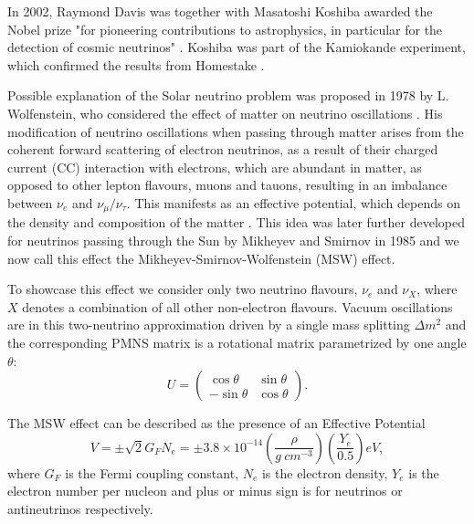 In 2002, Raymond Davis was together with Masatoshi Koshiba awarded the Nobel prize "for pioneering contributions to astrophysics, in particular for the detection of cosmic neutrinos" \cite{Nobel}. Koshiba was part of the Kamiokande experiment, which confirmed the results from Homestake \cite{Kamiokande96.pdf}.

Possible explanation of the Solar neutrino problem was proposed in 1978 by L. Wolfenstein, who considered the effect of matter on neutrino oscillations \cite{Wolfenstein78.pdf}. His modification of neutrino oscillations when passing through matter arises from the coherent forward scattering of electron neutrinos, as a result of their charged current (CC) interaction with electrons, which are abundant in matter, as opposed to other lepton flavours, muons and tauons, resulting in an imbalance between $\nu_e$ and $\nu_{\mu}/\nu_{\tau}$. This manifests as an effective potential, which depends on the density and composition of the matter \cite{Wolfenstein78.pdf}. This idea was later further developed for neutrinos passing through the Sun by Mikheyev and Smirnov in 1985 \cite{MikheyevSmirnov85.pdf}\cite{Gonzalez-GarciaNuMassesAndMixing.pdf} and we now call this effect the Mikheyev-Smirnov-Wolfenstein (MSW) effect.

To showcase this effect we consider only two neutrino flavours, $\nu_e$ and $\nu_X$, where $X$ denotes a combination of all other non-electron flavours. Vacuum oscillations are in this two-neutrino approximation driven by a single mass splitting $\Delta m^2$ and the corresponding PMNS matrix is a rotational matrix parametrized by one angle $\theta$:
\begin{equation}
U=
\begin{pmatrix}
 \cos\theta  & \sin\theta    \\
 -\sin\theta & \cos\theta
\end{pmatrix}.
\end{equation}

The MSW effect can be described as the presence of an Effective Potential \cite{CERNSchool2001.pdf}
\begin{equation}
V=\pm\sqrt{2}G_{F}N_{e}=\pm 3.8\times 10^{-14}\left(\frac{\rho}{\unit{g}\ \unit{cm^{-3}}}\right)\left(\frac{Y_e}{0.5}\right)\unit{eV},
\end{equation}
where $G_F$ is the Fermi coupling constant, $N_e$ is the electron density, $Y_e$ is the electron number per nucleon and plus or minus sign is for neutrinos or antineutrinos respectively.

